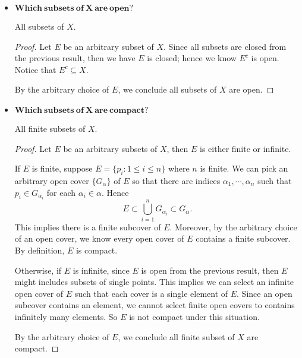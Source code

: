 \begin{Exercise}
\begin{itemize}
\begin{proof}
Pick $r = \frac{1}{2}$, then the neighborhood $N_r(p)$ only contains $p$ itself, then $p\notin E'$. By the arbitrary choice of $p$, then $E' = \emptyset$. This implies that $E'\subseteq E$ vacuously, so $E$ is closed.

By the arbitrary choice of $E$, we conclude all subsets of $X$ are closed.
\end{proof}

\item $\mathbf{Which\ subsets\ of\ X\ are\ open?}$
\begin{answer}
All subsets of $X$.
\end{answer}
\begin{proof}
Let $E$ be an arbitrary subset of $X$. Since all subsets are closed from the previous result, then we have $E$ is closed; hence we know $E^c$ is open. Notice that $E^c \subseteq X$.

By the arbitrary choice of $E$, we conclude all subsets of $X$ are open. 
\end{proof}

\item $\mathbf{Which\ subsets\ of\ X\ are\ compact?}$
\begin{answer}
All finite subsets of $X$.
\end{answer}
\begin{proof}
Let $E$ be an arbitrary subsets of $X$, then $E$ is either finite or infinite.

If $E$ is finite, suppose $E = \{p_i: 1\leq i\leq n\}$ where $n$ is finite. We can pick an arbitrary open cover $\{G_{\alpha}\}$ of $E$ so that there are indices $\alpha_{1}, \cdots, \alpha_{n}$ such that $p_i\in G_{\alpha_i}$ for each $\alpha_i\in \alpha$. Hence
$$
E \subset \bigcup_{i=1}^{n}G_{\alpha_i} \subset G_{\alpha}.
$$
This implies there is a finite subcover of $E$. Moreover, by the arbitrary choice of an open cover, we know every open cover of $E$ contains a finite subcover. By definition, $E$ is compact.

Otherwise, if $E$ is infinite, since $E$ is open from the previous result, then $E$ might includes subsets of single points. This implies we can select an infinite open cover of $E$ such that each cover is a single element of $E$. Since an open subcover contains an element, we cannot select finite open covers to contains infinitely many elements. So $E$ is not compact under this situation.

By the arbitrary choice of $E$, we conclude all finite subset of $X$ are compact.
\end{proof}
\end{itemize}
\end{Exercise}